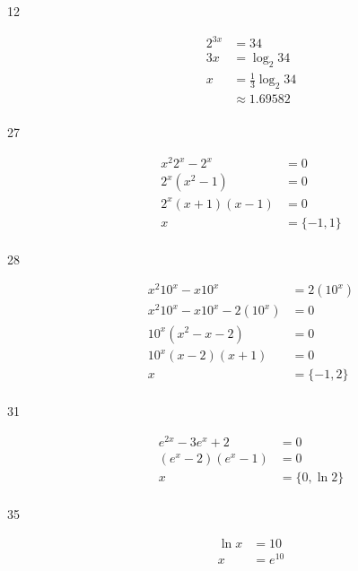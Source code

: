 \documentclass{exam}
\begin{document}
\begin{description}
      \item[12]
        \begin{align*}
          2^{3x} &= 34 \\
          3x     &= \log_2 34 \\
          x      &= \frac{1}{3} \log_2 34 \\
                 &\approx 1.69582 \\
        \end{align*}

      \item[27]
        \begin{align*}
          x^2 2^x - 2^x              &= 0 \\
          2^x \left( x^2 - 1 \right) &= 0 \\
          2^x(x + 1)(x - 1)          &= 0 \\
          x                          &= \boxed{ \{ -1, 1 \} } \\
        \end{align*}

      \item[28]
        \begin{align*}
          x^2 10^x - x 10^x           &= 2(10^x) \\
          x^2 10^x - x 10^x - 2(10^x) &= 0 \\
           10^x (x^2  - x  - 2)       &= 0 \\
           10^x (x - 2)(x + 1)        &= 0 \\
          x                           &= \boxed{ \{ -1, 2 \} } \\
        \end{align*}

      \item[31]
        \begin{align*}
          e^{2x} - 3e^x + 2  &= 0 \\
          (e^x - 2)(e^x - 1) &= 0 \\
          x                  &= \boxed{ \{ 0, \ln 2 \} } \\
        \end{align*}

      \item[35] 
        \begin{align*}
          \ln x &= 10 \\
          x     &= \boxed{e^{10}} \\
        \end{align*}


\end{description}
\end{document}

